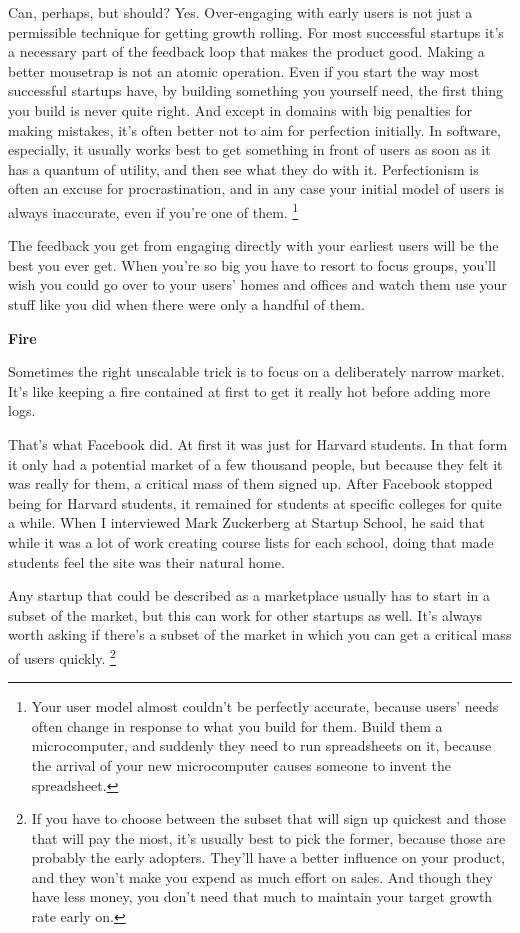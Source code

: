 \documentclass[12pt]{book}
\begin{document}
Can, perhaps, but should? Yes. Over-engaging with early users is not
just a permissible technique for getting growth rolling. For most
successful startups it's a necessary part of the feedback loop that
makes the product good. Making a better mousetrap is not an atomic
operation. Even if you start the way most successful startups have, by
building something you yourself need, the first thing you build is never
quite right. And except in domains with big penalties for making
mistakes, it's often better not to aim for perfection initially. In
software, especially, it usually works best to get something in front of
users as soon as it has a quantum of utility, and then see what they do
with it. Perfectionism is often an excuse for procrastination, and in
any case your initial model of users is always inaccurate, even if
you're one of them. \footnote{Your user model almost couldn't be perfectly accurate, because
users' needs often change in response to what you build for them. Build
them a microcomputer, and suddenly they need to run spreadsheets on it,
because the arrival of your new microcomputer causes someone to invent
the spreadsheet.}

The feedback you get from engaging directly with your earliest users
will be the best you ever get. When you're so big you have to resort to
focus groups, you'll wish you could go over to your users' homes and
offices and watch them use your stuff like you did when there were only
a handful of them.

\textbf{Fire}

Sometimes the right unscalable trick is to focus on a deliberately
narrow market. It's like keeping a fire contained at first to get it
really hot before adding more logs.

That's what Facebook did. At first it was just for Harvard students. In
that form it only had a potential market of a few thousand people, but
because they felt it was really for them, a critical mass of them signed
up. After Facebook stopped being for Harvard students, it remained for
students at specific colleges for quite a while. When I interviewed Mark
Zuckerberg at Startup School, he said that while it was a lot of work
creating course lists for each school, doing that made students feel the
site was their natural home.

Any startup that could be described as a marketplace usually has to
start in a subset of the market, but this can work for other startups as
well. It's always worth asking if there's a subset of the market in
which you can get a critical mass of users quickly.
\footnote{If you have to choose between the subset that will sign up
quickest and those that will pay the most, it's usually best to pick the
former, because those are probably the early adopters. They'll have a
better influence on your product, and they won't make you expend as much
effort on sales. And though they have less money, you don't need that
much to maintain your target growth rate early on.}
\end{document}
